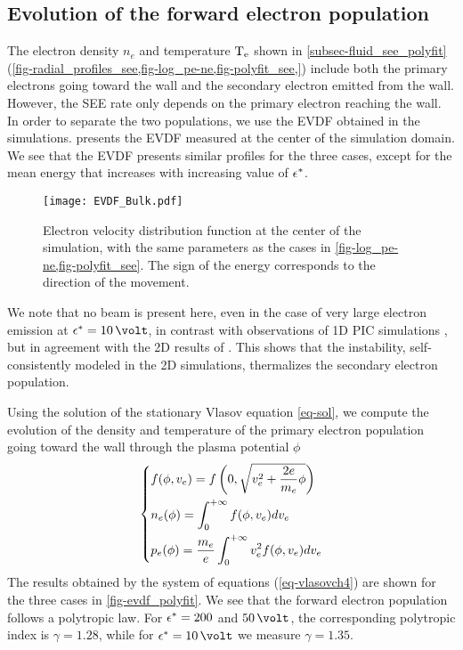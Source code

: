 \subsection{Evolution of the forward electron population} \label{subsec-EVDF_see_polyfit}

The electron density $n_e$ and  temperature $\mathrm{T_e}$ shown in \cref{subsec-fluid_see_polyfit} (\cref{fig-radial_profiles_see,fig-log_pe-ne,fig-polyfit_see,}) include both the primary electrons going toward the wall and the secondary electron emitted from the wall.
However, the \ac{SEE} rate only depends on the primary electron reaching the wall.
In order to separate the two populations, we use the \ac{EVDF} obtained in the simulations.
 presents the \ac{EVDF} measured at the center of the simulation domain. 
We see that the \ac{EVDF} presents similar profiles for the three cases, except for the mean energy that increases with increasing value of $\epsilon^{*}$.
\begin{figure}[!hbt]
  \centering
  \texttt{[image: EVDF\_Bulk.pdf]}
  \caption{Electron velocity distribution function at the center of the simulation, with the same parameters as the cases in \cref{fig-log_pe-ne,fig-polyfit_see}. The sign of the energy corresponds to the direction of the movement.}
  \label{fig-evdf_epsstar}
\end{figure}

We note that no beam is present here, even in the case of very large electron emission at $\crover=10\,\volt$, in contrast with observations of \ac{1D} PIC simulations \citep{sydorenko2006b,sydorenko2007}, but in agreement with the \ac{2D} results of \citet{heron2013}.
This shows that the instability, self-consistently modeled in the \ac{2D} simulations, thermalizes the secondary electron population.

Using the solution of the stationary Vlasov equation \cref{eq-sol}, we compute the evolution of the density and temperature of the primary electron population going toward the wall through the plasma potential $\phi$ 
\begin{equation} \label{eq-vlasovch4}
  \begin{dcases}
    f(\phi, v_e) = f \left( 0, \sqrt{v_e^2 + \frac{2 e}{m_e} \phi} \right) \\
    n_e(\phi) = \int_0^{+\infty} f(\phi, v_e) dv_e \\
    p_e(\phi) = \frac{m_e}{e} \int_0^{+\infty} v_e^2 f(\phi, v_e) dv_e \\
  \end{dcases}
\end{equation}
The results obtained by the system of equations (\ref{eq-vlasovch4}) are shown for the three cases in \cref{fig-evdf_polyfit}.
We see that the forward electron population follows a polytropic law.
For $\epsilon^{*}= 200$ and $50\,\volt$, the corresponding polytropic index is $\gamma=1.28$, while for $\crover= 10\,\volt$ we measure $\gamma=1.35$.

